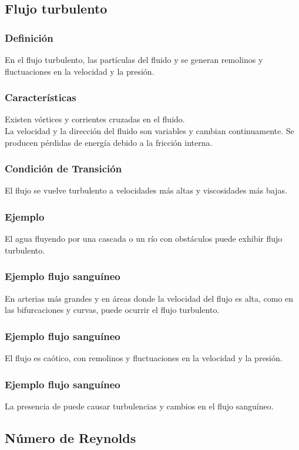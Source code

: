 \documentclass[14pt]{beamer}
\begin{document}
\subsection{Flujo turbulento}

\begin{frame}
\frametitle{Definición}
En el flujo turbulento, las partículas del fluido  y se generan remolinos y fluctuaciones en la velocidad y la presión.
\end{frame}
\begin{frame}
\frametitle{Características}
Existen vórtices y corrientes cruzadas en el fluido.
\\
\bigskip
\pause
La velocidad y la dirección del fluido son variables y cambian continuamente. \pause Se producen pérdidas de energía debido a la fricción interna.
\end{frame}
\begin{frame}
\frametitle{Condición de Transición}
El flujo se vuelve turbulento a velocidades más altas y viscosidades más bajas.
\end{frame}
\begin{frame}
\frametitle{Ejemplo}
El agua fluyendo por una cascada o un río con obstáculos puede exhibir flujo turbulento.
\end{frame}
\begin{frame}
\frametitle{Ejemplo flujo sanguíneo}
En arterias más grandes y en áreas donde la velocidad del flujo es alta, como en las bifurcaciones y curvas, puede ocurrir el flujo turbulento.
\end{frame}
\begin{frame}
\frametitle{Ejemplo flujo sanguíneo}
El flujo es caótico, con remolinos y fluctuaciones en la velocidad y la presión.
\end{frame}
\begin{frame}
\frametitle{Ejemplo flujo sanguíneo}
La presencia de  puede causar turbulencias y cambios en el flujo sanguíneo.
\end{frame}

\subsection{Número de Reynolds}
\end{document}
